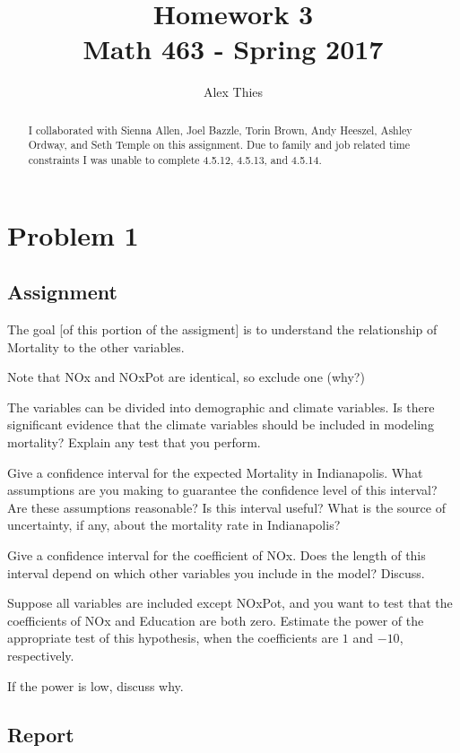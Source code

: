 \documentclass{amsart}\usepackage[]{graphicx}\usepackage[]{color}
\author{Alex Thies}
\title{Homework 3 \\ Math 463 - Spring 2017}
\begin{document}
	\begin{abstract}
		I collaborated with Sienna Allen, Joel Bazzle, Torin Brown, Andy Heeszel, Ashley Ordway, and Seth Temple on this assignment.
		Due to family and job related time constraints I was unable to complete 4.5.12, 4.5.13, and 4.5.14.
	\end{abstract}

	\maketitle
	\section{Problem 1} %
	\label{sec:problem_1}
		\subsection{Assignment} %
		\label{sub:assignment1}
			The goal [of this portion of the assigment] is to understand the relationship of Mortality to the other variables.

			Note that NOx and NOxPot are identical, so exclude one (why?)

			The variables can be divided into demographic and climate variables.
			Is there significant evidence that the climate variables should be included in modeling mortality?
			Explain any test that you perform.

			Give a confidence interval for the expected Mortality in Indianapolis.
			What assumptions are you making to guarantee the confidence level of this interval?
			Are these assumptions reasonable?
			Is this interval useful?
			What is the source of uncertainty, if any, about the mortality rate in Indianapolis?

			Give a confidence interval for the coefficient of NOx.
			Does the length of this interval depend on which other variables you include in the model?
			Discuss.

 			Suppose all variables are included except NOxPot, and you want to test that the coefficients of NOx and Education are both zero.
 			Estimate the power of the appropriate test of this hypothesis, when the coefficients are $1$ and $-10$, respectively.

			If the power is low, discuss why.

		\subsection{Report} %
		\label{sub:report1}
\end{document}
